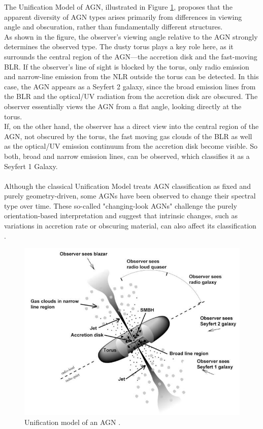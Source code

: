 The Unification Model of AGN, illustrated in Figure \ref{fig:agn_sed}, proposes that the apparent diversity of AGN types arises primarily from differences in viewing angle and obscuration, rather than fundamentally different structures.\\
As shown in the figure, the observer’s viewing angle relative to the AGN strongly determines the observed type. The dusty torus plays a key role here, as it surrounds the central region of the AGN—the accretion disk and the fast-moving BLR. If the observer's line of sight is blocked by the torus, only radio emission and narrow-line emission from the NLR outside the torus can be detected. In this case, the AGN appears as a Seyfert 2 galaxy, since the broad emission lines from the BLR and the optical/UV radiation from the accretion disk are obscured. The observer essentially views the AGN from a flat angle, looking directly at the torus.\\
If, on the other hand, the observer has a direct view into the central region of the AGN, not obscured by the torus, the fast moving gas clouds of the BLR as well as the optical/UV emission continuum from the accretion disk become visible. So both, broad and narrow emission lines, can be observed, which classifies it as a Seyfert 1 Galaxy. \parencite{urry1995unified}\\\\
Although the classical Unification Model treats AGN classification as fixed and purely geometry-driven, some AGNs have been observed to change their spectral type over time. These so-called "changing-look AGNs" challenge the purely orientation-based interpretation and suggest that intrinsic changes, such as variations in accretion rate or obscuring material, can also affect its classification \parencite{ricci2022changinglook}.






\begin{figure}[!ht]
	\centering
	\includegraphics[width=\textwidth]{pictures/Chapter2/AGN_unified_model.jpg}
	\caption{Unification model of an AGN \parencite{fermi2025figure1}.}
	\label{fig:agn_sed}
\end{figure}

